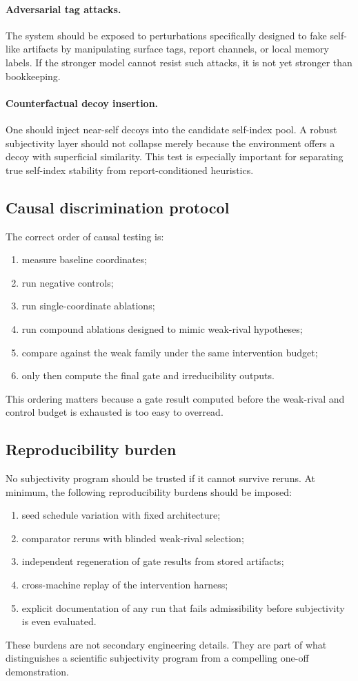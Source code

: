 \documentclass[11pt,a4paper]{article}
\theoremstyle{definition}
\begin{document}
\paragraph{Adversarial tag attacks.}
The system should be exposed to perturbations specifically designed to fake self-like artifacts by manipulating surface tags, report channels, or local memory labels. If the stronger model cannot resist such attacks, it is not yet stronger than bookkeeping.

\paragraph{Counterfactual decoy insertion.}
One should inject near-self decoys into the candidate self-index pool. A robust subjectivity layer should not collapse merely because the environment offers a decoy with superficial similarity. This test is especially important for separating true self-index stability from report-conditioned heuristics.

\subsection{Causal discrimination protocol}
The correct order of causal testing is:
\begin{enumerate}[leftmargin=1.5em]
\item measure baseline coordinates;
\item run negative controls;
\item run single-coordinate ablations;
\item run compound ablations designed to mimic weak-rival hypotheses;
\item compare against the weak family under the same intervention budget;
\item only then compute the final gate and irreducibility outputs.
\end{enumerate}
This ordering matters because a gate result computed before the weak-rival and control budget is exhausted is too easy to overread.

\subsection{Reproducibility burden}
No subjectivity program should be trusted if it cannot survive reruns. At minimum, the following reproducibility burdens should be imposed:
\begin{enumerate}[leftmargin=1.5em]
\item seed schedule variation with fixed architecture;
\item comparator reruns with blinded weak-rival selection;
\item independent regeneration of gate results from stored artifacts;
\item cross-machine replay of the intervention harness;
\item explicit documentation of any run that fails admissibility before subjectivity is even evaluated.
\end{enumerate}
These burdens are not secondary engineering details. They are part of what distinguishes a scientific subjectivity program from a compelling one-off demonstration.
\end{document}
